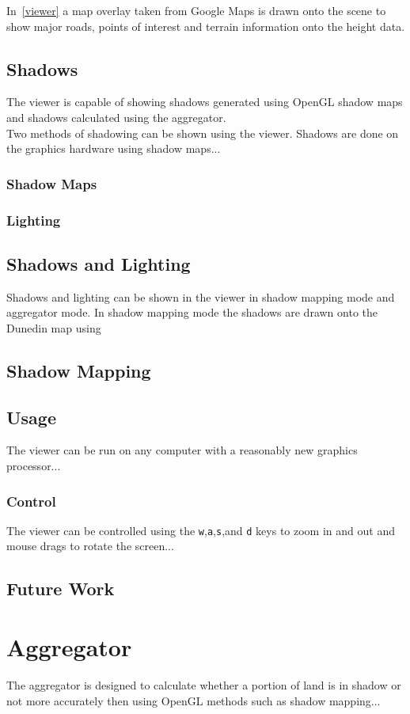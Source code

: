 \documentclass[12pt]{report}
\begin{document}
In~\ref{viewer} a map overlay taken from Google Maps\cite{gmaps} is drawn onto the scene to show major roads, points of interest and terrain information onto the height data. \\

\section{Shadows}
The viewer is capable of showing shadows generated using OpenGL shadow maps and shadows calculated using the aggregator. \\

Two methods of shadowing can be shown using the viewer. 
Shadows are done on the graphics hardware using shadow maps...
\subsection{Shadow Maps}
\subsection{Lighting}
\section{Shadows and Lighting}
Shadows and lighting can be shown in the viewer in shadow mapping mode and aggregator mode. In shadow mapping mode the shadows are drawn onto the Dunedin map using \\

\section{Shadow Mapping}

\section{Usage}
The viewer can be run on any computer with a reasonably new graphics processor...
\subsection{Control}
The viewer can be controlled using the \texttt{w},\texttt{a},\texttt{s},and \texttt{d} keys to zoom in and out and mouse drags to rotate the screen...
\section{Future Work}
\chapter{Aggregator}
The aggregator is designed to calculate whether a portion of land is in shadow or not more accurately then using OpenGL methods such as shadow mapping...
\end{document}
